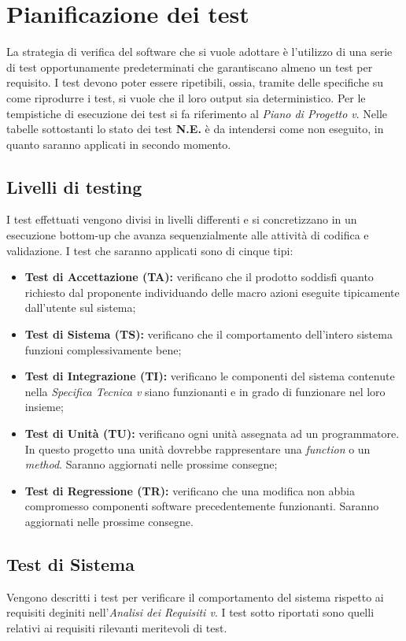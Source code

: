 \def\arraystretch{1.5}
\section{Pianificazione dei test}
La strategia di verifica del software che si vuole adottare è l'utilizzo di una serie di test opportunamente  predeterminati che garantiscano almeno un test per requisito. I test devono poter essere ripetibili, ossia, tramite delle specifiche su come riprodurre i test, si vuole che il loro output sia deterministico. Per le tempistiche di esecuzione dei test si fa riferimento al \emph{Piano di Progetto v}\VersionePP.
Nelle tabelle sottostanti lo stato dei test \textbf{N.E.} è da intendersi come non eseguito, in quanto saranno applicati in secondo momento.

\subsection{Livelli di testing}
I test effettuati vengono divisi in livelli differenti  e si concretizzano in un esecuzione bottom-up che avanza sequenzialmente alle attività di codifica e validazione. I test che saranno applicati sono di cinque tipi:
\begin{itemize}
\item \textbf{Test di Accettazione (TA): } verificano che il prodotto soddisfi quanto richiesto dal proponente individuando delle macro azioni eseguite tipicamente dall'utente sul sistema;
\item \textbf{Test di Sistema (TS): } verificano che il comportamento dell'intero sistema funzioni complessivamente bene;
\item \textbf{Test di Integrazione (TI): } verificano le componenti del sistema contenute nella \emph{Specifica Tecnica v}\VersioneST{} siano funzionanti e in grado di funzionare nel loro insieme;
\item \textbf{Test di Unità (TU): } verificano ogni unità assegnata ad un programmatore. In questo progetto una unità dovrebbe rappresentare una \emph{function} o un \emph{method}. Saranno aggiornati nelle prossime consegne;
\item \textbf{Test di Regressione (TR): } verificano che una modifica non abbia compromesso componenti software precedentemente funzionanti. Saranno aggiornati nelle prossime consegne.
\end{itemize}


\subsection{Test di Sistema}
Vengono descritti i test per verificare il comportamento del sistema rispetto ai requisiti deginiti nell'\emph{Analisi dei Requisiti v}\VersioneAR.
I test sotto riportati sono quelli relativi ai requisiti rilevanti meritevoli di test.
